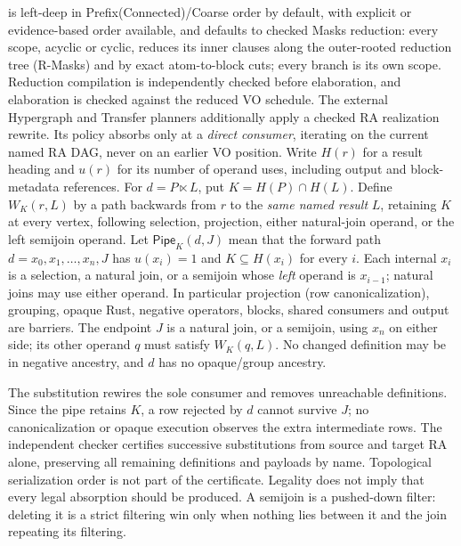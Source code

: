  is left-deep in Prefix(Connected)/Coarse order by default, with
explicit or evidence-based order available, and defaults to checked Masks
reduction: every scope, acyclic or cyclic, reduces its inner clauses along the
outer-rooted reduction tree (R-Masks) and by exact atom-to-block cuts; every
branch is its own scope. Reduction compilation is independently checked before
elaboration, and elaboration is checked against the reduced VO schedule. The
external Hypergraph and Transfer planners additionally apply a checked RA
realization rewrite. Its policy absorbs only at a \emph{direct consumer},
iterating on the current named RA DAG, never on an earlier VO position.
Write $H(r)$ for a result heading and $u(r)$ for its number of operand uses,
including output and block-metadata references. For $d=P\ltimes L$, put
$K=H(P)\cap H(L)$. Define $W_K(r,L)$ by a path backwards from $r$ to the
\emph{same named result} $L$, retaining $K$ at every vertex, following selection,
projection, either natural-join operand, or the left semijoin operand.
Let $\mathsf{Pipe}_K(d,J)$ mean that the forward path
$d=x_0,x_1,\ldots,x_n,J$ has $u(x_i)=1$ and $K\subseteq H(x_i)$ for every $i$.
Each internal $x_i$ is a selection, a natural join, or a semijoin whose
\emph{left} operand is $x_{i-1}$; natural joins may use either operand.
In particular projection (row canonicalization), grouping, opaque Rust,
negative operators, blocks, shared consumers and output are barriers.
The endpoint $J$ is a natural join, or a semijoin, using $x_n$ on either
side; its other operand $q$ must satisfy $W_K(q,L)$. No changed definition
may be in negative ancestry, and $d$ has no opaque/group ancestry.
\begin{mathpar}
\end{mathpar}
The substitution rewires the sole consumer and removes unreachable definitions.
Since the pipe retains $K$, a row rejected by $d$ cannot survive $J$; no
canonicalization or opaque execution observes the extra intermediate rows.
The independent checker certifies successive substitutions from source and
target RA alone, preserving all remaining definitions and payloads by name.
Topological serialization order is not part of the certificate.
Legality does not imply that every legal absorption should be produced.
A semijoin is a pushed-down filter: deleting it is a strict filtering win
only when nothing lies between it and the join repeating its filtering.
